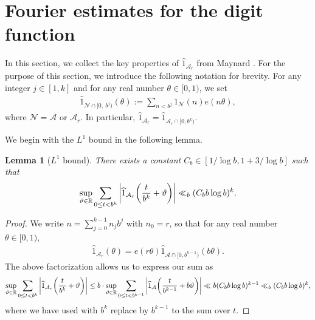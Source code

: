 \documentclass[12pt]{amsart}
\numberwithin{equation}{section}
\newtheorem{lemma}[theorem]{Lemma}
\theoremstyle{remark}
\theoremstyle{definition}
\begin{document}
 



















\section{Fourier estimates for the digit function}\label{digitsec}
In this section, we collect the key properties of  $\widehat{1}_{\mathcal{A}_r}$ from Maynard \cite{May2}.
For the purpose of this section, we introduce the following notation for brevity. For any integer $j\in [1, k]$ and for any real number $\theta\in [0, 1)$, we set
\begin{align}
\widehat{1}_{\mathcal{N} \cap [0,\: b^j)}(\theta):=\sum_{n<b^j}1_{\mathcal{N}}(n)e(n\theta),
\end{align}
where $\mathcal{N}=\mathcal{A}$ or $\mathcal{A}_r$. In particular, $\widehat{1}_{\mathcal{A}_r} = \widehat{1}_{\mathcal{A}_r\cap [0, b^k)}$.

We begin with the $L^1$ bound in the following lemma.
\begin{lemma}[$L^1$ bound] \label{lemd1} There exists a constant $C_b \in [1/\log b, 1+3/\log b]$ such that
\begin{align}
\notag \sup_{\vartheta\in \mathbb{R}}\sum_{0\leq t <b^k}\bigg|\widehat{1}_{\mathcal{A}_r}\bigg(\frac{t}{b^k} + \vartheta\bigg)\bigg| \ll_{b} (C_b b
\log b)^k.
\end{align}
\end{lemma}

\begin{proof}
 We write $n=\sum_{j=0}^{k-1}n_jb^j$ with $n_0=r$, so that for any real number $\theta\in [0, 1)$,
\begin{align}
\label{factorMay} \widehat{1}_{\mathcal{A}_r}(\theta)=e(r\theta)\widehat{1}_{\mathcal{A}\cap[0, b^{k-1})}(b\theta).
\end{align}
The above factorization allows us to express our sum as
\begin{align}\notag
\sup_{\vartheta\in \mathbb{R}}\sum_{0\leq t <b^k}\bigg|\widehat{1}_{\mathcal{A}_r}\bigg(\dfrac{t}{b^k}+ \vartheta\bigg)\bigg| \leq b\cdot \sup_{\vartheta\in \mathbb{R}}\sum_{0\leq t <b^{k-1}}\bigg|\widehat{1}_{\mathcal{A}}\bigg(\dfrac{t}{b^{k-1}} + b\vartheta\bigg)\bigg| \ll b(C_bb\log b)^{k-1} \ll_{b} (C_bb\log b)^k,
\end{align}
where we have used \cite[Lemma 5.1]{May2} with $b^k$ replace by $b^{k-1}$ to the sum over $t$.
\end{proof}
\end{document}
